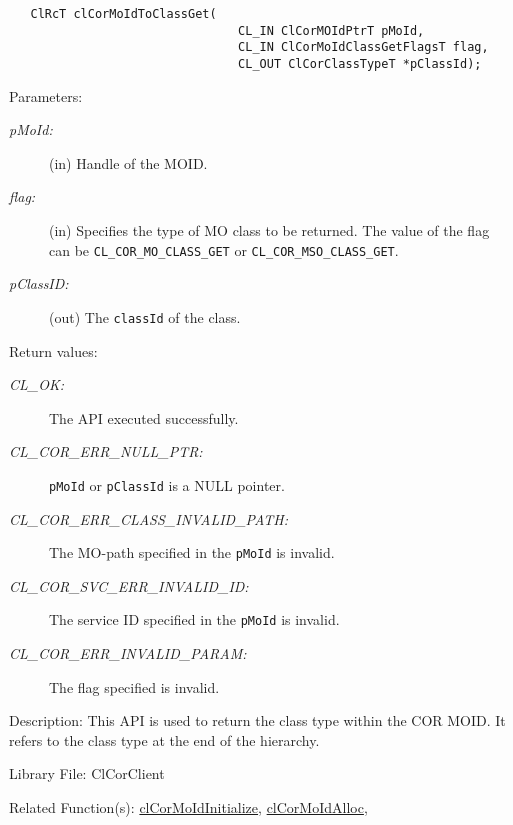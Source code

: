 \begin{flushleft}
\begin{Desc}
\footnotesize\begin{verbatim}   ClRcT clCorMoIdToClassGet(
                         		CL_IN ClCorMOIdPtrT pMoId,
                         		CL_IN ClCorMoIdClassGetFlagsT flag,
                         		CL_OUT ClCorClassTypeT *pClassId);
\end{verbatim}
\normalsize
\end{Desc}
\begin{Desc}
\item[Parameters:]
\begin{description}
\item[{\em p\-MoId:}](in) Handle of the MOID. 
\item[{\em flag:}](in) Specifies the type of MO class to be returned. The value of the flag can be  
{\tt{CL\_\-COR\_\-MO\_\-CLASS\_\-GET}} or {\tt{CL\_\-COR\_\-MSO\_\-CLASS\_\-GET}}. 
\item[{\em p\-Class\-ID:}](out) The {\tt{classId}} of the class.\end{description}
\end{Desc}
\begin{Desc}
\item[Return values:]
\begin{description}
\item[{\em CL\_\-OK:}]The API executed successfully.
\item[{\em CL\_\-COR\_\-ERR\_\-NULL\_\-PTR:}] {\tt{pMoId}} or {\tt{pClassId}} is a NULL pointer.
\item[{\em CL\_\-COR\_\-ERR\_\-CLASS\_\-INVALID\_\-PATH:}] The MO-path specified in the {\tt{pMoId}} is invalid.
\item[{\em CL\_\-COR\_\-SVC\_\-ERR\_\-INVALID\_\-ID:}] The service ID specified in the {\tt{pMoId}} is invalid.
\item[{\em CL\_\-COR\_\-ERR\_\-INVALID\_\-PARAM:}] The flag specified is invalid.
\end{description}
\end{Desc}
\begin{Desc}
\item[Description:]This API is used to return the class type within the COR MOID. It refers to the class type at the end of the 
hierarchy.\end{Desc}
\begin{Desc}
\item[Library File:]Cl\-Cor\-Client\end{Desc}
\begin{Desc}
\item[Related Function(s):]\hyperlink{pagecor100}{cl\-Cor\-MoId\-Initialize}, \hyperlink{pagecor113}{cl\-Cor\-MoId\-Alloc}, 

\end{Desc}
\end{flushleft}
